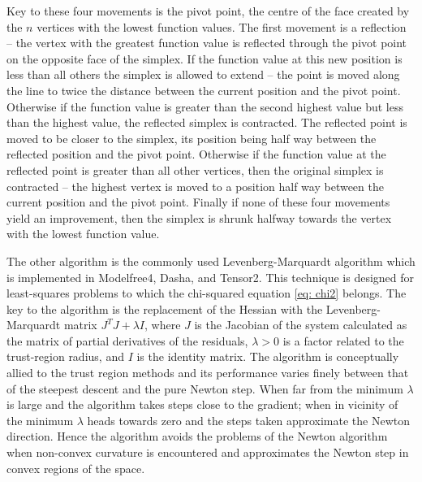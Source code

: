 \begin{htmlonly}
\begin{htmlonly}
Key to these four movements is the pivot point, the centre of the face created by the $n$ vertices with the lowest function values.  The first movement is a reflection -- the vertex with the greatest function value is reflected through the pivot point on the opposite face of the simplex.  If the function value at this new position is less than all others the simplex is allowed to extend -- the point is moved along the line to twice the distance between the current position and the pivot point.  Otherwise if the function value is greater than the second highest value but less than the highest value, the reflected simplex is contracted.  The reflected point is moved to be closer to the simplex, its position being half way between the reflected position and the pivot point.  Otherwise if the function value at the reflected point is greater than all other vertices, then the original simplex is contracted -- the highest vertex is moved to a position half way between the current position and the pivot point.  Finally if none of these four movements yield an improvement, then the simplex is shrunk halfway towards the vertex with the lowest function value.

The other algorithm is the commonly used Levenberg-Marquardt algorithm \citep{Levenberg44,Marquardt63} which is implemented in Modelfree4, Dasha, and Tensor2.  This technique is designed for least-squares problems to which the chi-squared equation \eqref{eq: chi2} belongs.  The key to the algorithm is the replacement of the Hessian with the Levenberg-Marquardt matrix $J^T J + \lambda I$, where $J$ is the Jacobian of the system calculated as the matrix of partial derivatives of the residuals, $\lambda > 0$ is a factor related to the trust-region radius, and $I$ is the identity matrix.  The algorithm is conceptually allied to the trust region methods and its performance varies finely between that of the steepest descent and the pure Newton step.  When far from the minimum $\lambda$ is large and the algorithm takes steps close to the gradient; when in vicinity of the minimum $\lambda$ heads towards zero and the steps taken approximate the Newton direction.  Hence the algorithm avoids the problems of the Newton algorithm when non-convex curvature is encountered and approximates the Newton step in convex regions of the space.




\end{htmlonly}
\end{htmlonly}
